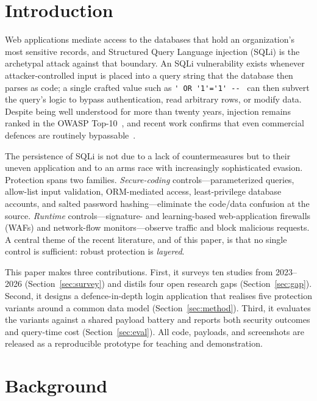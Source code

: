 \documentclass[pdflatex,sn-mathphys-num]{sn-jnl}
\begin{document}
\section{Introduction}\label{sec:intro}

Web applications mediate access to the databases that hold an organization's most
sensitive records, and Structured Query Language injection (SQLi) is the archetypal
attack against that boundary. An SQLi vulnerability exists whenever attacker-controlled
input is placed into a query string that the database then parses as code; a single
crafted value such as \lstinline|' OR '1'='1' -- | can then subvert the query's
logic to bypass authentication, read arbitrary rows, or modify data. Despite being
well understood for more than twenty years, injection remains ranked in the OWASP
Top-10~\cite{owasp2021top10}, and recent work confirms that even commercial
defences are routinely bypassable~\cite{qu2024advsqli}.

The persistence of SQLi is not due to a lack of countermeasures but to their uneven
application and to an arms race with increasingly sophisticated evasion. Protection
spans two families. \emph{Secure-coding} controls---parameterized queries, allow-list
input validation, ORM-mediated access, least-privilege database accounts, and salted
password hashing---eliminate the code/data confusion at the source. \emph{Runtime}
controls---signature- and learning-based web-application firewalls (WAFs) and
network-flow monitors---observe traffic and block malicious requests. A central
theme of the recent literature, and of this paper, is that no single control is
sufficient: robust protection is \emph{layered}.

This paper makes three contributions. First, it surveys ten studies from 2023--2026
(Section~\ref{sec:survey}) and distils four open research gaps
(Section~\ref{sec:gap}). Second, it designs a defence-in-depth login application
that realises five protection variants around a common data model
(Section~\ref{sec:method}). Third, it evaluates the variants against a shared
payload battery and reports both security outcomes and query-time cost
(Section~\ref{sec:eval}). All code, payloads, and screenshots are released as a
reproducible prototype for teaching and demonstration.

\section{Background}\label{sec:background}
\end{document}
